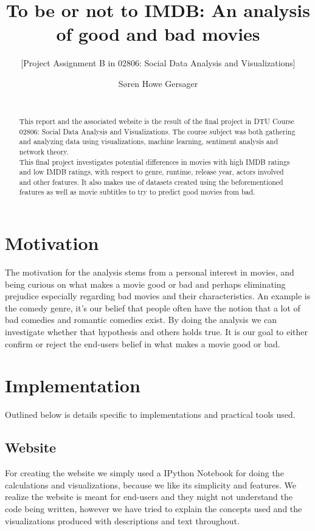 \documentclass{acm_proc_article-sp}
\begin{document}
\title{To be or not to IMDB: An analysis of good and bad movies}
\subtitle{[Project Assignment B in 02806: Social Data Analysis and Visualizations]
}
\author
{
	\alignauthor Søren Howe Gersager\\
       \\
}
\maketitle
\begin{abstract}
This report and the associated website\cite{website} is the result of the final project in DTU Course 02806: Social Data Analysis and Visualizations. The course subject was both gathering and analyzing data using visualizations, machine learning, sentiment analysis and network theory.\\
This final project investigates potential differences in movies with high IMDB ratings and low IMDB ratings, with respect to genre, runtime, release year, actors involved and other features. It also makes use of datasets created using the beforementioned features as well as movie subtitles to try to predict good movies from bad.
\end{abstract}

\section{Motivation}
The motivation for the analysis stems from a personal interest in movies, and being curious on what makes a movie good or bad and perhaps eliminating prejudice especially regarding bad movies and their characteristics. An example is the comedy genre, it's our belief that people often have the notion that a lot of bad comedies and romantic comedies exist. By doing the analysis we can investigate whether that hypothesis and others holds true. It is our goal to either confirm or reject the end-users belief in what makes a movie good or bad.  
\section{Implementation}
Outlined below is details specific to implementations and practical tools used.
\subsection{Website}
For creating the website we simply used a IPython Notebook for doing the calculations and visualizations, because we like its simplicity and features. We realize the website is meant for end-users and they might not understand the code being written, however we have tried to explain the concepts used and the visualizations produced with descriptions and text throughout.
\end{document}
